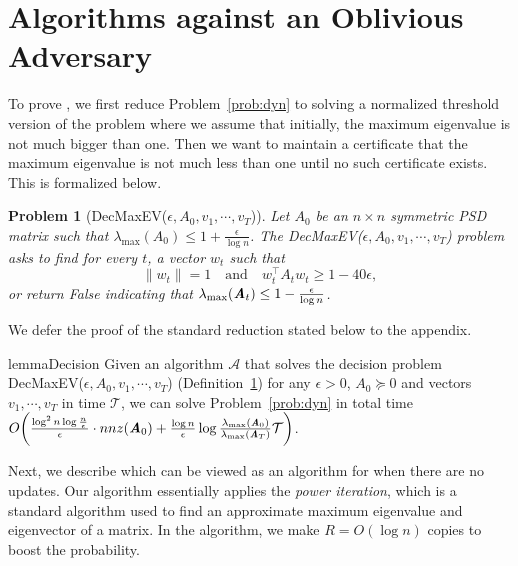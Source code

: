 \documentclass[11pt]{article}
\newtheorem{problem}[theorem]{Problem}
\let\originalleft\left
\let\originalright\right
\renewcommand{\left}{\mathopen{}\mathclose\bgroup\originalleft}
\renewcommand{\right}{\aftergroup\egroup\originalright}
\newcommand\vv{\boldsymbol{\mathit{v}}}
\newcommand\ww{\boldsymbol{\mathit{w}}}
\renewcommand\AA{\boldsymbol{\mathit{A}}}
\begin{document}
 	


\section{Algorithms against an Oblivious Adversary}\label{sec:Obl}

To prove , we first reduce Problem~\ref{prob:dyn} to solving a normalized threshold version of the problem where we assume that initially, the maximum eigenvalue is not much bigger than one. Then we want to maintain a certificate that 
the maximum eigenvalue is not much less than one until no such certificate exists. This is formalized below.
\begin{problem}[DecMaxEV($\epsilon,\AA_0,\vv_1,\cdots,\vv_T$)]\label{def:DecMaxEval} Let $\AA_0$ be an $n\times n$ symmetric PSD matrix such that $ \lambda_{\max}(\AA_0) \leq 1 + \frac{\epsilon}{\log n}$. The {\sc DecMaxEV}($\epsilon,\AA_0,\vv_1,\cdots,\vv_T$) problem asks to find for every $t$, a vector $\ww_t$ such that 
\[
\|\ww_t\| = 1 \quad \text{and} \quad \ww_t^{\top}\AA_t \ww_t \geq 1-40\epsilon,
\]
or return {\sc False} indicating that $\lambda_{\max}(\AA_t)\le 1- \frac{\eps}{\log n}$.
\end{problem} 
We defer the proof of the standard reduction stated below to the appendix.
\begin{restatable}{lemma}{Decision}\label{lem:Decision}
Given an algorithm $\mathcal{A}$ that solves the decision problem {\sc DecMaxEV}($\epsilon,\AA_0,\vv_1,\cdots,\vv_T$) (Definition~\ref{def:DecMaxEval}) for any $\epsilon>0$, $\AA_0 \succeq 0$ and vectors $\vv_1,\cdots,\vv_T$ in time $\mathcal{T}$, we can solve Problem~\ref{prob:dyn} in total time $O\left(\frac{\log^2 n\log\frac{n}{\epsilon}}{\epsilon}\cdot nnz(\AA_0) + \frac{\log n}{\epsilon}\log \frac{\lambda_{\max}(\AA_0)}{\lambda_{\max}(\AA_T)}\mathcal{T}\right)$.
\end{restatable}
Next, we describe  which can be viewed as an algorithm for  when there are no updates. 
Our algorithm essentially applies the {\it power iteration}, which is a standard algorithm used to find an approximate maximum eigenvalue and eigenvector of a matrix. In the algorithm, we make $R = O(\log n)$ copies to boost the probability.
\end{document}

